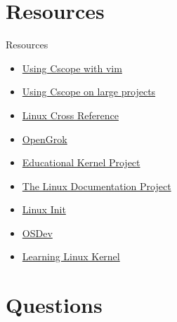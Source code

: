 \documentclass{workshop}
\begin{document}
\section{Resources}
\begin{frame}{Resources}
  \begin{itemize}
  \item \href{http://cscope.sourceforge.net/cscope_vim_tutorial.html}{Using Cscope with vim}
  \item \href{http://cscope.sourceforge.net/large_projects.html}{Using Cscope on large projects}
  \item \href{http://lxr.free-electrons.com/}{Linux Cross Reference}
  \item \href{http://hub.opensolaris.org/bin/view/Project+opengrok/}{OpenGrok}
  \item \href{http://oszur11.git.sourceforge.net/git/gitweb.cgi?p=oszur11/oszur11;a=tree;hb=e2c6c782f3595dcb5293d790a28d67f47529cfaf}{Educational
  Kernel Project}
  \item \href{http://tldp.org/}{The Linux Documentation Project}
  \item \href{http://tldp.org/HOWTO/Linux-Init-HOWTO.html}{Linux Init}
  \item \href{http://wiki.osdev.org/Main_Page}{OSDev}
  \item \href{http://www.learninglinuxkernel.com/}{Learning Linux Kernel}
  \end{itemize}
\end{frame}

\section{Questions}
\end{document}
